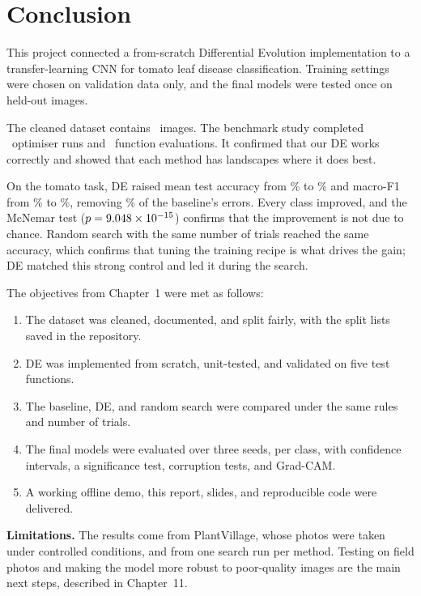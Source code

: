 \chapter{Conclusion}
This project connected a from-scratch Differential Evolution implementation to a transfer-learning CNN for tomato leaf disease classification. Training settings were chosen on validation data only, and the final models were tested once on held-out images.

The cleaned dataset contains \TotalN\ images. The benchmark study completed \TotalBenchmarkRuns\ optimiser runs and \TotalBenchmarkEvaluations\ function evaluations. It confirmed that our DE works correctly and showed that each method has landscapes where it does best.

On the tomato task, DE raised mean test accuracy from \BaseAcc\% to \DEAcc\% and macro-F1 from \BaseFone\% to \DEFone\%, removing \ErrorReduction\% of the baseline's errors. Every class improved, and the McNemar test ($p=\num{9.048e-15}$) confirms that the improvement is not due to chance. Random search with the same number of trials reached the same accuracy, which confirms that tuning the training recipe is what drives the gain; DE matched this strong control and led it during the search.

The objectives from Chapter~1 were met as follows:
\begin{enumerate}
\item The dataset was cleaned, documented, and split fairly, with the split lists saved in the repository.
\item DE was implemented from scratch, unit-tested, and validated on five test functions.
\item The baseline, DE, and random search were compared under the same rules and number of trials.
\item The final models were evaluated over three seeds, per class, with confidence intervals, a significance test, corruption tests, and Grad-CAM.
\item A working offline demo, this report, slides, and reproducible code were delivered.
\end{enumerate}

\textbf{Limitations.} The results come from PlantVillage, whose photos were taken under controlled conditions, and from one search run per method. Testing on field photos and making the model more robust to poor-quality images are the main next steps, described in Chapter~11.
